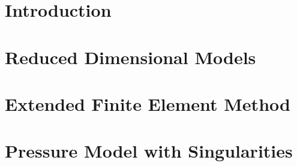 \documentclass[bibliography=totocnumbered,dvipsnames,FM,Dis, EN]{tulthesis_autoreferat}
\begin{document}
% 


\chapter{Introduction}





\chapter{Reduced Dimensional Models} \label{chap:reduced}





\chapter{Extended Finite Element Method} \label{chap:xfem_soa}






\chapter{Pressure Model with Singularities} \label{chap:xfem_pressure}



\end{document}
